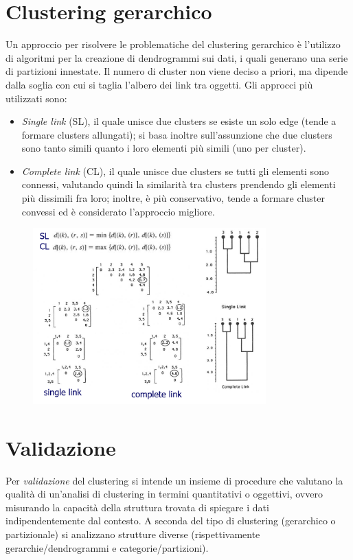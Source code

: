 \documentclass[a4paper,oneside,titlepage]{book}
\begin{document}
\section{Clustering gerarchico}
Un approccio per risolvere le problematiche del clustering gerarchico è l'utilizzo di algoritmi per la creazione di dendrogrammi sui dati, i quali generano una serie di partizioni innestate. Il numero di cluster non viene deciso a priori, ma dipende dalla soglia con cui si taglia l'albero dei link tra oggetti. Gli approcci più utilizzati sono:
\begin{itemize}
    \item \textit{Single link} (SL), il quale unisce due clusters se esiste un solo edge (tende a formare clusters allungati); si basa inoltre sull'assunzione che due clusters sono tanto simili quanto i loro elementi più simili (uno per cluster).
    \item \textit{Complete link} (CL), il quale unisce due clusters se tutti gli elementi sono connessi, valutando quindi la similarità tra clusters prendendo gli elementi più dissimili fra loro; inoltre, è più conservativo, tende a formare cluster convessi ed è considerato l'approccio migliore.
\end{itemize}
\begin{figure}[htp]
	\centering
	\includegraphics[width=0.8\textwidth]{clustering5.png}
\end{figure}

\section{Validazione}
Per \textit{validazione} del clustering si intende un insieme di procedure che valutano la qualità di un'analisi di clustering in termini quantitativi o oggettivi, ovvero misurando la capacità della struttura trovata di spiegare i dati indipendentemente dal contesto. A seconda del tipo di clustering (gerarchico o partizionale) si analizzano strutture diverse (rispettivamente gerarchie/dendrogrammi e categorie/partizioni).
\end{document}
